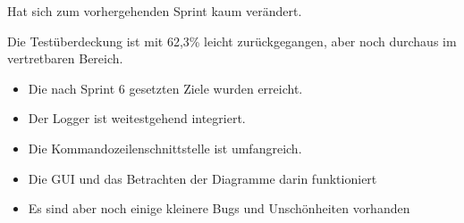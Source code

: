 
\nsecend


\nsecend %


\nsecend%


\nsecend%


\nsecend


\nsecend

Hat sich zum vorhergehenden Sprint kaum verändert.
\nsecend%

Die Testüberdeckung ist mit 62,3\% leicht zurückgegangen, aber noch durchaus im vertretbaren Bereich.
\nsecend%


\nsecend%


\nsecend%

\begin{itemize}
\item Die nach Sprint 6 gesetzten Ziele wurden erreicht.
\item Der Logger ist weitestgehend integriert.
\item Die Kommandozeilenschnittstelle ist umfangreich.
\item Die GUI und das Betrachten der Diagramme darin funktioniert
\item Es sind aber noch einige kleinere Bugs und Unschönheiten vorhanden
\end{itemize}
\nsecend%


\nsecend%